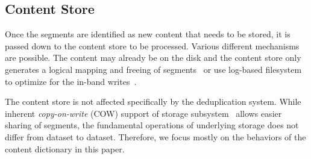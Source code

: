 \subsection{Content Store}

Once the segments are identified as new content that needs to be stored, it is passed down to the content store to be processed. Various different mechanisms are possible. The content may already be on the disk and the content store only generates a logical mapping and freeing of segments~\cite{clements:2009, rhea:2008} or use log-based filesystem to optimize for the in-band writes~\cite{zhu:2008}.

The content store is not affected specifically by the deduplication system. While inherent \emph{copy-on-write} (COW) support of storage subsystem~\cite{bonwick:2003, dillon:2008} allows easier sharing of segments, the fundamental operations of underlying storage does not differ from dataset to dataset. Therefore, we focus mostly on the behaviors of the content dictionary in this paper.

